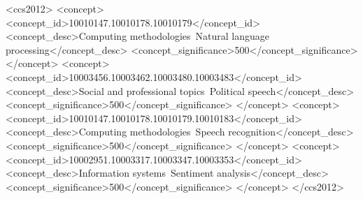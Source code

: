 \documentclass[manuscript,screen,review]{acmart}
\begin{document}
\begin{abstract}
This manuscript compares Alcide De Gasperi and Giorgia Meloni rhetoric. After building a corpus of public speeches transcribed with Whisper from Giorgia Meloni's videos on YouTube, I compare them with a corpus of speeches from the Italian Republic's first Prime Minister Alcide De Gasperi. The results show that De Gasperi's speeches are, on average, 30\% more diversified in their lexicon, and the corpora have a Jaccard similarity index of 32\%. The highest-frequency words in common show transversal themes, such as freedom, peace and nation, while the highest-frequency words not in common reflect the PMs' different political and societal landscapes. I also performed a sentiment analysis on each speech using a BERT classifier. The results underscore the importance of domain-appropriate training data: the model was trained on product reviews, not on political rhetoric, which translated to an average confidence of roughly 40\% per classification.
\end{abstract}
\begin{CCSXML}
<ccs2012>
   <concept>
       <concept_id>10010147.10010178.10010179</concept_id>
       <concept_desc>Computing methodologies~Natural language processing</concept_desc>
       <concept_significance>500</concept_significance>
       </concept>
   <concept>
       <concept_id>10003456.10003462.10003480.10003483</concept_id>
       <concept_desc>Social and professional topics~Political speech</concept_desc>
       <concept_significance>500</concept_significance>
       </concept>
   <concept>
       <concept_id>10010147.10010178.10010179.10010183</concept_id>
       <concept_desc>Computing methodologies~Speech recognition</concept_desc>
       <concept_significance>500</concept_significance>
       </concept>
   <concept>
       <concept_id>10002951.10003317.10003347.10003353</concept_id>
       <concept_desc>Information systems~Sentiment analysis</concept_desc>
       <concept_significance>500</concept_significance>
       </concept>
 </ccs2012>
\end{CCSXML}

\end{document}
